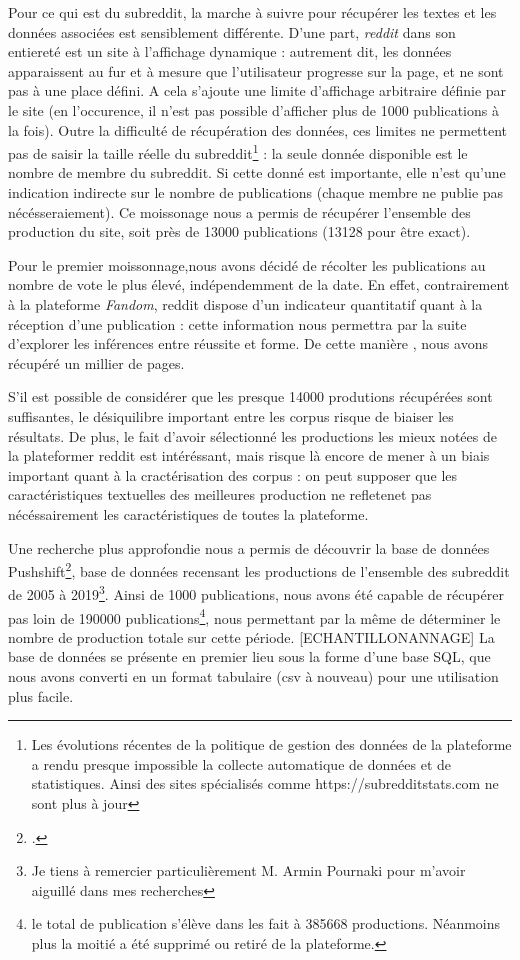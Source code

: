 \documentclass[12pt,a4paper,oneside,titlepage]{book} %
\begin{document}
	Pour ce qui est du subreddit, la marche à suivre pour récupérer les textes et les données associées est sensiblement différente. D'une part, \emph{reddit} dans son entiereté est un site à l'affichage dynamique : autrement dit, les données apparaissent au fur et à mesure que l'utilisateur progresse sur la page, et ne sont pas à une place défini. A cela s'ajoute une limite d'affichage arbitraire définie par le site (en l'occurence, il n'est pas possible d'afficher plus de 1000 publications à la fois). 
	Outre la difficulté de récupération des données, ces limites ne permettent pas de saisir la taille réelle du subreddit\footnote{Les évolutions récentes de la politique de gestion des données de la plateforme a rendu presque impossible la collecte automatique de données et de statistiques. Ainsi des sites spécialisés comme https://subredditstats.com ne sont plus à jour} : la seule donnée disponible est le nombre de membre du subreddit. Si cette donné est importante, elle n'est qu'une indication indirecte sur le nombre de publications (chaque membre ne publie pas nécésseraiement). 
	Ce moissonage nous a permis de récupérer l'ensemble des production du site, soit près de 13000 publications (13128 pour être exact).
		
	Pour le premier moissonnage,nous avons décidé de récolter les publications au nombre de vote le plus élevé, indépendemment de la date. En effet, contrairement à la plateforme \textit{Fandom}, reddit dispose d'un indicateur quantitatif quant à la réception d'une publication : cette information nous permettra par la suite d'explorer les inférences entre réussite et forme.
	De cette manière , nous avons récupéré un millier de pages. 
	
	S'il est possible de considérer que les presque 14000 produtions récupérées sont suffisantes, le désiquilibre important entre les corpus risque de biaiser les résultats. De plus, le fait d'avoir sélectionné les productions les mieux notées de la plateformer reddit est intéréssant, mais risque là encore de mener à un biais important quant à la cractérisation des corpus : on peut supposer que les caractéristiques textuelles des meilleures production ne refletenet pas nécéssairement les caractéristiques de toutes la plateforme.
	
	Une recherche plus approfondie nous a permis de découvrir la base de données Pushshift\footcite{baumgartner_pushshift_2020}, base de données recensant les productions de l'ensemble des subreddit de 2005 à 2019\footnote{Je tiens à remercier particulièrement M. Armin Pournaki pour m'avoir aiguillé dans mes recherches}. Ainsi de 1000 publications, nous avons été capable de récupérer pas loin de 190000 publications\footnote{le total de publication s'élève dans les fait à 385668 productions. Néanmoins plus la moitié a été supprimé ou retiré de la plateforme.}, nous permettant par la même de déterminer le nombre de production totale sur cette période. [ECHANTILLONANNAGE]	
	La base de données se présente en premier lieu sous la forme d'une base SQL, que nous avons converti en un format tabulaire (csv à nouveau) pour une utilisation plus facile. 
\end{document}

